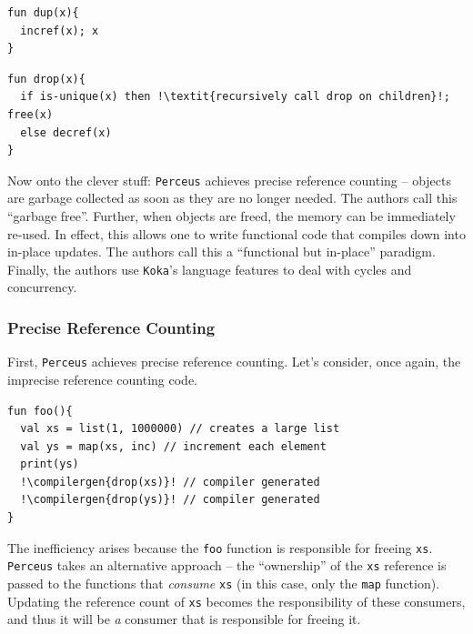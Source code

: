 \begin{code}
\label{code:reference-count-dup}
\begin{verbatim}
fun dup(x){
  incref(x); x
}
\end{verbatim}
\end{code}

\begin{code}
\label{code:reference-count-drop}
\begin{verbatim}
fun drop(x){
  if is-unique(x) then !\textit{recursively call drop on children}!; free(x)
  else decref(x)
}
\end{verbatim}
\end{code}

Now onto the clever stuff: \texttt{Perceus} achieves precise reference counting -- objects are garbage collected as soon as they are no longer needed. The authors call this ``garbage free''. Further, when objects are freed, the memory can be immediately re-used. In effect, this allows one to write functional code that compiles down into in-place updates. The authors call this a ``functional but in-place'' paradigm. Finally, the authors use \texttt{Koka}'s language features to deal with cycles and concurrency.

\subsubsection{Precise Reference Counting}
First, \texttt{Perceus} achieves precise reference counting. Let's consider, once again, the imprecise reference counting code. 

\begin{code}
\label{code:reference-count-base}
\begin{verbatim}
fun foo(){
  val xs = list(1, 1000000) // creates a large list
  val ys = map(xs, inc) // increment each element
  print(ys)
  !\compilergen{drop(xs)}! // compiler generated
  !\compilergen{drop(ys)}! // compiler generated
}
\end{verbatim}
\end{code}
The inefficiency arises because the \texttt{foo} function is responsible for freeing \texttt{xs}. \texttt{Perceus} takes an alternative approach -- the ``ownership'' of the \texttt{xs} reference is passed to the functions that \textit{consume} \texttt{xs} (in this case, only the \texttt{map} function). Updating the reference count of \texttt{xs} becomes the responsibility of these consumers, and thus it will be \textit{a} consumer that is responsible for freeing it. 

